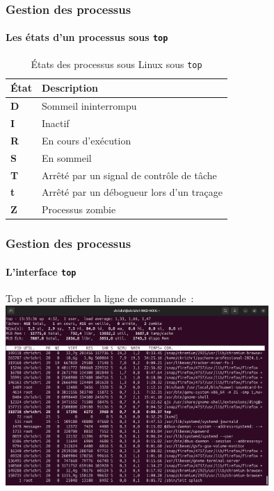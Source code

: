 \documentclass{beamer}
\begin{document}
    \begin{frame}
        \transdissolve
        \frametitle{Gestion des processus}
        \framesubtitle{Les états d'un processus sous \lstinline{top}}
        \begin{table}[h!]
            \centering
            \begin{tabular}{|p{}|p{}|}
                \hline
                \textbf{État} & \textbf{Description}                      \\ \hline
                \textbf{D}    & Sommeil ininterrompu                      \\ \hline
                \textbf{I}    & Inactif                                   \\ \hline
                \textbf{R}    & En cours d'exécution                      \\ \hline
                \textbf{S}    & En sommeil                                \\ \hline
                \textbf{T}    & Arrêté par un signal de contrôle de tâche \\ \hline
                \textbf{t}    & Arrêté par un débogueur lors d'un traçage \\ \hline
                \textbf{Z}    & Processus zombie                          \\ \hline
            \end{tabular}
            \caption{États des processus sous Linux sous \lstinline{top}}
        \end{table}
    \end{frame}

    \begin{frame}
        \transdissolve
        \frametitle{Gestion des processus}
        \framesubtitle{L'interface \lstinline{top}}
        Top et  pour afficher la ligne de commande~:
        \bigbreak
        \centering
        \includegraphics[width=10cm]{image/top-interface}
    \end{frame}
\end{document}
